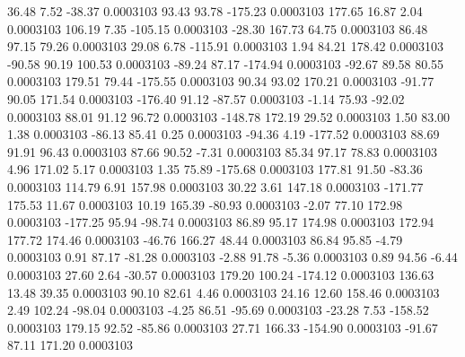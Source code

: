        36.48        7.52      -38.37     0.0003103
       93.43       93.78     -175.23     0.0003103
      177.65       16.87        2.04     0.0003103
      106.19        7.35     -105.15     0.0003103
      -28.30      167.73       64.75     0.0003103
       86.48       97.15       79.26     0.0003103
       29.08        6.78     -115.91     0.0003103
        1.94       84.21      178.42     0.0003103
      -90.58       90.19      100.53     0.0003103
      -89.24       87.17     -174.94     0.0003103
      -92.67       89.58       80.55     0.0003103
      179.51       79.44     -175.55     0.0003103
       90.34       93.02      170.21     0.0003103
      -91.77       90.05      171.54     0.0003103
     -176.40       91.12      -87.57     0.0003103
       -1.14       75.93      -92.02     0.0003103
       88.01       91.12       96.72     0.0003103
     -148.78      172.19       29.52     0.0003103
        1.50       83.00        1.38     0.0003103
      -86.13       85.41        0.25     0.0003103
      -94.36        4.19     -177.52     0.0003103
       88.69       91.91       96.43     0.0003103
       87.66       90.52       -7.31     0.0003103
       85.34       97.17       78.83     0.0003103
        4.96      171.02        5.17     0.0003103
        1.35       75.89     -175.68     0.0003103
      177.81       91.50      -83.36     0.0003103
      114.79        6.91      157.98     0.0003103
       30.22        3.61      147.18     0.0003103
     -171.77      175.53       11.67     0.0003103
       10.19      165.39      -80.93     0.0003103
       -2.07       77.10      172.98     0.0003103
     -177.25       95.94      -98.74     0.0003103
       86.89       95.17      174.98     0.0003103
      172.94      177.72      174.46     0.0003103
      -46.76      166.27       48.44     0.0003103
       86.84       95.85       -4.79     0.0003103
        0.91       87.17      -81.28     0.0003103
       -2.88       91.78       -5.36     0.0003103
        0.89       94.56       -6.44     0.0003103
       27.60        2.64      -30.57     0.0003103
      179.20      100.24     -174.12     0.0003103
      136.63       13.48       39.35     0.0003103
       90.10       82.61        4.46     0.0003103
       24.16       12.60      158.46     0.0003103
        2.49      102.24      -98.04     0.0003103
       -4.25       86.51      -95.69     0.0003103
      -23.28        7.53     -158.52     0.0003103
      179.15       92.52      -85.86     0.0003103
       27.71      166.33     -154.90     0.0003103
      -91.67       87.11      171.20     0.0003103
